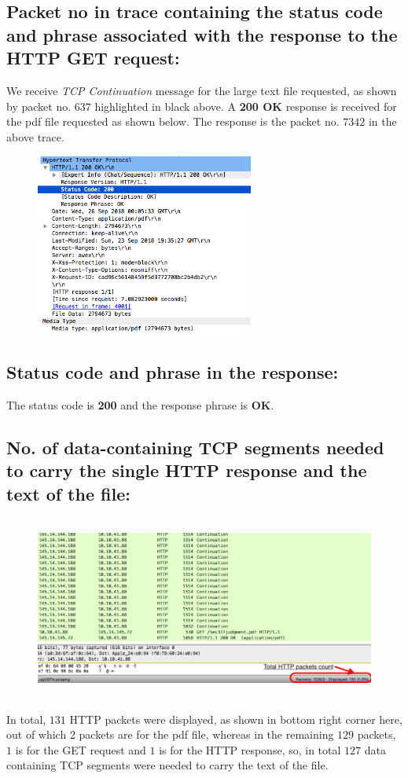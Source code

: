 \documentclass[]{report}
\begin{document}
\subsection{Packet no in trace containing the status code and phrase associated with the response to the HTTP GET request:}
We receive \textit{TCP Continuation} message for the large text file requested, as shown by packet no. $637$ highlighted in black above. A \textbf{200 OK} response is received for the pdf file requested as shown below. The response is the packet no. $7342$ in the above trace.
\begin{figure}[H]
	\vspace{0pt}
	\includegraphics[height = 170pt, keepaspectratio]{Snapshots/q3/3_3.png}
\end{figure}
\subsection{Status code and phrase in the response:}
The status code is \textbf{200} and the response phrase is \textbf{OK}.
\subsection{No. of data-containing TCP segments needed to carry the single HTTP response and the text of the file:}
\begin{figure}[H]
	\vspace{0pt}
	\includegraphics[height = 170pt, keepaspectratio]{Snapshots/q3/3_4.png}
\end{figure}
In total, $131$ HTTP packets were displayed, as shown in bottom right corner here, out of which 2 packets are for the pdf file, whereas in the remaining $129$ packets, $1$ is for the GET request and $1$ is for the HTTP response, so, in total $127$ data containing TCP segments were needed to carry the text of the file. 
\end{document}
